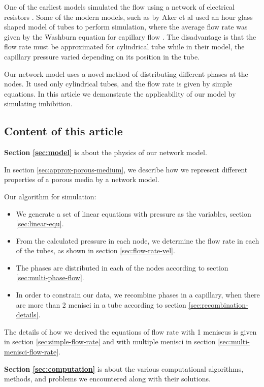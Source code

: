 	One of the earliest models simulated the flow using a network of electrical resistors \cite{fatt1956network}. Some of the modern models, such as by Aker et al \cite{aker1998two} used an hour glass shaped model of tubes  to perform simulation, where the average flow rate was given by the Washburn equation for capillary flow \cite{washburn1921dynamics}. The disadvantage is that the flow rate must be approximated for cylindrical tube while in their model, the capillary pressure varied depending on its position in the tube.
	
	Our network model uses a novel method of distributing different phases at the nodes. It used only cylindrical tubes, and the flow rate is given by simple equations. In this article we demonstrate the applicability of our model by simulating imbibition.
	
\subsection{Content of this article}
	\textbf{Section \ref{sec:model}} is about the physics of our network model.
	
	In section \ref{sec:approx-porous-medium}, we describe how we represent different properties of a porous media by a network model.
	
	Our algorithm for simulation:
	\begin{itemize}
		\item We generate a set of linear equations with pressure as the variables, section \ref{sec:linear-equ}.
		
		\item From the calculated pressure in each node, we determine the flow rate in each of the tubes, as shown in section \ref{sec:flow-rate-vel}.
		
		\item The phases are distributed in each of the nodes according to section \ref{sec:multi-phase-flow}.
		
		\item In order to constrain our data, we recombine phases in a capillary, when there are more than 2 menisci in a tube according to section \ref{sec:recombination-details}.
	\end{itemize}
	
	The details of how we derived the equations of flow rate with 1 meniscus is given in section \ref{sec:simple-flow-rate} and with multiple menisci in section \ref{sec:multi-menisci-flow-rate}.
	
	\textbf{Section \ref{sec:computation}} is about the various computational algorithms, methods, and problems we encountered along with their solutions. 
	
